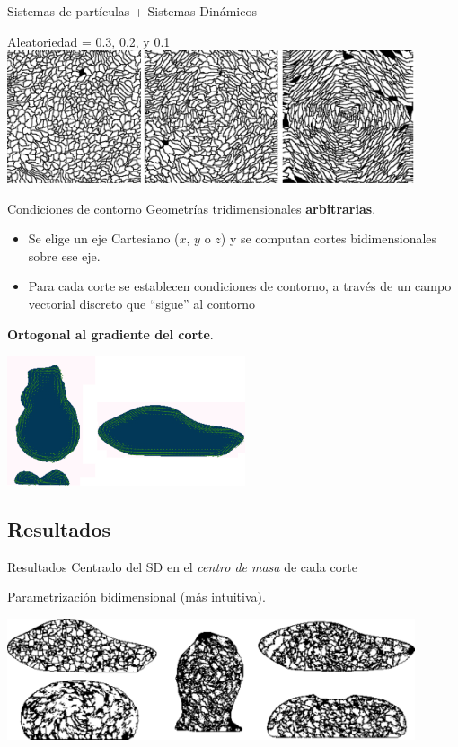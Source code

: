 \documentclass[spanish,unknownkeysallowed]{beamer}
\begin{document}
\begin{frame}{Sistemas de partículas + Sistemas Dinámicos}

Aleatoriedad = 0.3, 0.2, y 0.1
\vspace{0.1cm}
  \includegraphics[width=12cm]{../figures/Fig3}
\end{frame}

\begin{frame}{Condiciones de contorno}
Geometrías tridimensionales \textbf{arbitrarias}.

\begin{itemize}
\item Se elige un eje Cartesiano ($x$, $y$ o $z$) y se computan cortes bidimensionales sobre ese eje.
\item Para cada corte se establecen condiciones de contorno, a través de un campo vectorial discreto que ``sigue'' al contorno
\end{itemize}

\textbf{Ortogonal al gradiente del corte}.

  \centerline{\includegraphics[width=7cm]{../figures/Fig4}}
\end{frame}

\subsection{Resultados}

\begin{frame}{Resultados}
Centrado del SD en el {\em centro de masa} de cada corte

Parametrización bidimensional (más intuitiva).

\includegraphics[width=12cm]{../figures/Fig5}
\end{frame}
\end{document}
